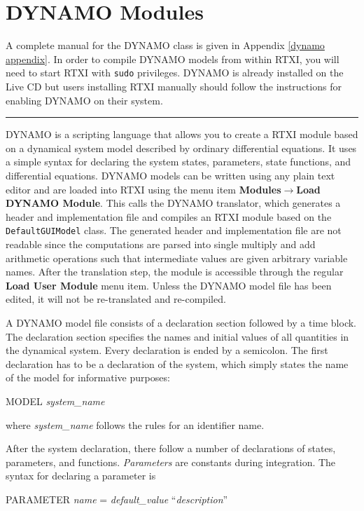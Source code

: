 \section{DYNAMO Modules}
\label{dynamomodules}
A complete manual for the DYNAMO class is given in Appendix \ref{dynamo appendix}.
\attention In order to compile DYNAMO models from within RTXI, you will need to start RTXI with \texttt{sudo} privileges.  DYNAMO is already installed on the Live CD but users installing RTXI manually should follow the instructions for enabling DYNAMO on their system. \vspace{.5cm}
\hrule
\vspace{.5cm}
DYNAMO is a scripting language that allows you to create a RTXI module based on a dynamical system model described by ordinary differential equations. It uses a simple syntax for declaring the system states, parameters, state functions, and differential equations. DYNAMO models can be written using any plain text editor and are loaded into RTXI using the menu item \textbf{Modules}$\rightarrow$\textbf{Load DYNAMO Module}. This calls the DYNAMO translator, which generates a \cpp  header and implementation file and compiles an RTXI module based on the \texttt{DefaultGUIModel} class. The generated header and implementation file are not readable since the computations are parsed into single multiply and add arithmetic operations such that intermediate values are given arbitrary variable names. After the translation step, the module is accessible through the regular \textbf{Load User Module} menu item. Unless the DYNAMO model file has been edited, it will not be re-translated and re-compiled.

A DYNAMO model file consists of a declaration section followed by a time block. The declaration section specifies the names and initial values of all quantities in the dynamical system. Every declaration is ended by a semicolon. The first declaration has to be a declaration of the system, which simply states the name of the model for informative purposes:

\begin{example}
  MODEL \emph{system\_name}
\end{example}

where \emph{system\_name} follows the rules for an identifier name.

After the system declaration, there follow a number of declarations of states, parameters, and functions. \emph{Parameters} are constants during integration. The syntax for declaring a parameter is
\begin{example}
        PARAMETER \emph{name} = \emph{default\_value} ``\emph{description}''
\end{example}

